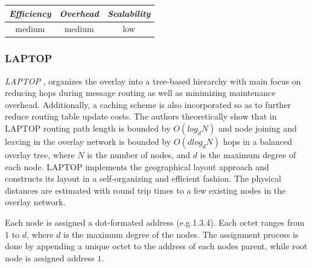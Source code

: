 \begin{center}
\begin{tabular}{ccc}
\emph{Efficiency} & \emph{Overhead} & \emph{Scalability} \\
\hline
medium &
medium &
low
\end{tabular}
\end{center}

\subsubsection{LAPTOP}
\emph{LAPTOP} \cite{WLH2007}, organizes the overlay into a tree-based hierarchy
with main focus on reducing hops during message routing as well as minimizing
maintenance overhead. Additionally, a caching scheme is also incorporated so as
to further reduce routing table update costs. The authors theoretically show
that in LAPTOP routing path length is bounded by $O(log_d N)$ and node joining
and leaving in the overlay network is bounded by $O\left( d log_d N \right)$
hops in a balanced overlay tree, where $N$ is the number of nodes, and $d$ is
the maximum degree of each node. LAPTOP implements the geographical layout
approach  and constructs its layout in a self-organizing and efficient fashion.
The physical distances are estimated with round trip times to a few existing
nodes in the overlay network.

Each node is assigned a dot-formated address (e.g 1.3.4). Each octet ranges from
$1$ to $d$, where $d$ is the maximum degree of the nodes. The assignment process
is done by appending a unique octet to the address of each nodes parent, while
root node is assigned address $1$.


